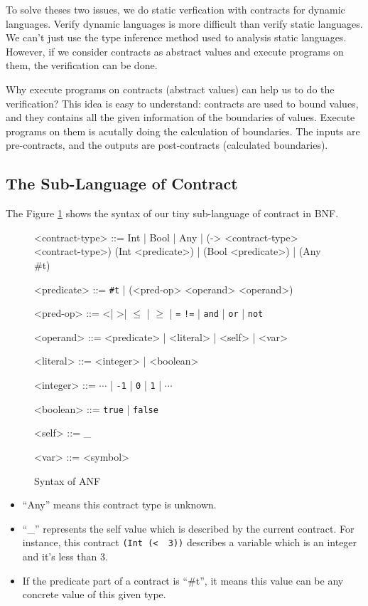 \documentclass[paper=a4, fontsize=11pt]{scrartcl} %
\numberwithin{equation}{section} %
\numberwithin{figure}{section} %
\numberwithin{table}{section} %
\begin{document}
To solve theses two issues, we do static verfication with contracts for dynamic languages. Verify dynamic languages is more difficult than verify static languages. We can't just use the type inference method used to analysis static languages. However, if we consider contracts as abstract values and execute programs on them, the verification can be done.

Why execute programs on contracts (abstract values) can help us to do the verification? This idea is easy to understand: contracts are used to bound values, and they contains all the given information of the boundaries of values. Execute programs on them is acutally doing the calculation of boundaries. The inputs are pre-contracts, and the outputs are post-contracts (calculated boundaries).

\subsection{The Sub-Language of Contract}
The Figure \ref{figc} shows the syntax of our tiny sub-language of contract in BNF.


\begin{figure}[h!]
\setlength{\grammarparsep}{7pt plus 1pt minus 1pt} %
\setlength{\grammarindent}{8em} %
\begin{grammar}
<contract-type> ::= Int | Bool | Any | (-> <contract-type> <contract-type>)
\alt (Int <predicate>) | (Bool <predicate>) | (Any \#t)

<predicate> ::= \texttt{\#t} | (<pred-op> <operand> <operand>)

<pred-op> ::= \textless | \textgreater | $\leq$ | $\geq$ | \texttt{=}
\alt \texttt{!=} | \texttt{and} | \texttt{or} | \texttt{not}

<operand> ::= <predicate> | <literal> | <self> | <var>


<literal> ::= <integer> | <boolean>

<integer> ::= $\cdots$ | \texttt{-1} | \texttt{0} | \texttt{1} | $\cdots$

<boolean> ::= \texttt{true} | \texttt{false}

<self> ::= _

<var> ::= <symbol>
\end{grammar}
\caption{Syntax of ANF}
\label{figc}
\end{figure}

\begin{itemize}
\item ``Any'' means this contract type is unknown.

\item ``_'' represents the self value which is described by the current contract. For instance, this contract \texttt{(Int\ (\textless\ \underscore\ 3))} describes a variable which is an integer and it's less than 3.

\item If the predicate part of a contract is ``\#t'', it means this value can be any concrete value of this given type.
\end{itemize}
\end{document}

